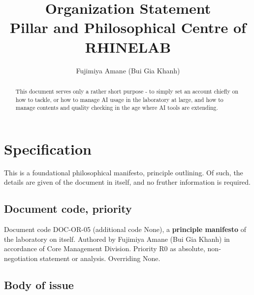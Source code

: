 \documentclass[10pt,a4paper]{article}
\title{\textbf{Organization Statement} \\ Pillar and Philosophical Centre of RHINELAB} %
\author{Fujimiya Amane (Bui Gia Khanh)} %
\affiliation{} %
\begin{document}
\maketitle

\begin{abstract}
    \noindent
    This document serves only a rather short purpose - to simply set an account chiefly on how to tackle, or how to manage AI usage in the laboratory at large, and how to manage contents and quality checking in the age where AI tools are extending. 

\end{abstract}

\vspace{2.5cm}



\thispagestyle{firstpage}

\pagebreak


\newgeometry{} %

\section{Specification}
\label{sec:spec}

This is a foundational philosophical manifesto, principle outlining. Of such, the details are given of the document in itself, and no fruther information is required. 
\subsection{Document code, priority}


Document code DOC-OR-05 (additional code None), a \textbf{principle manifesto} of the laboratory on itself. Authored by Fujimiya Amane (Bui Gia Khanh) in accordance of Core Management Division. Priority R0 as absolute, non-negotiation statement or analysis. Overriding None. 

\subsection{Body of issue}
\end{document}
